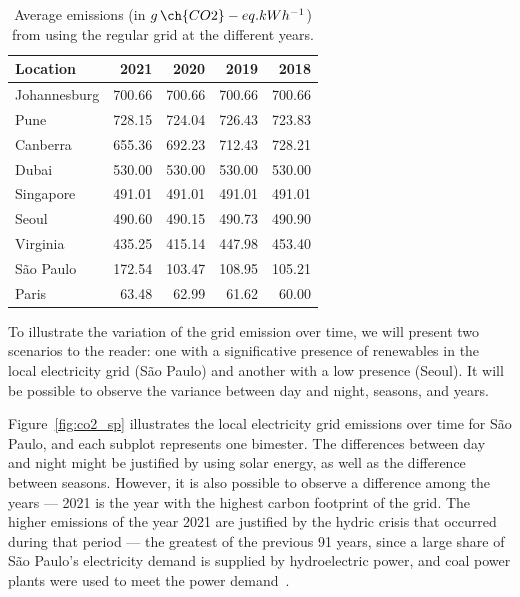 \begin{table}[h]
  \caption{Average emissions (in $g\,\ch{CO2}-eq.kWh^{-1}$) from using the regular grid at the different years.}\label{tab:grid_emissions_avg_year} \centering
  \begin{tabular}{|l|r|r|r|r|}    
  \hline   
  \textbf{Location} &  \textbf{2021} & \textbf{2020} & \textbf{2019} & \textbf{2018}\\
  \hline
  Johannesburg & 700.66 & 700.66 & 700.66 & 700.66  \\
  \hline
  Pune & 728.15 & 724.04 & 726.43 & 723.83     \\
  \hline
  Canberra & 655.36 & 692.23 & 712.43 & 728.21\\
  \hline
  Dubai & 530.00  & 530.00 & 530.00 & 530.00     \\
  \hline
  Singapore & 491.01 & 491.01 & 491.01 & 491.01 \\
  \hline     
  Seoul & 490.60 & 490.15 & 490.73 & 490.90     \\
  \hline
  Virginia  & 435.25 & 415.14 & 447.98 & 453.40 \\
  \hline
  São Paulo &  172.54 &  103.47 & 108.95 &  105.21 \\
  \hline 
  Paris &  63.48  & 62.99 & 61.62   & 60.00   \\
  \hline

\end{tabular}  
\end{table}


To illustrate the variation of the grid emission over time, we will present two scenarios to the reader: one with a significative presence of renewables in the local electricity grid (São Paulo) and another with a low presence (Seoul). It will be possible to observe the variance between day and night, seasons, and years.


Figure~\ref{fig:co2_sp} illustrates the local electricity grid emissions over time for São Paulo, and each subplot represents one bimester. The differences between day and night might be justified by using solar energy, as well as the difference between seasons. However, it is also possible to observe a difference among the years --- 2021 is the year with the highest carbon footprint of the grid. The higher emissions of the year 2021 are justified by the hydric crisis that occurred during that period --- the greatest of the previous 91 years, since a large share of São Paulo's electricity demand is supplied by hydroelectric power, and coal power plants were used to meet the power demand~\cite{CNN2021_crisehidrica}. %

